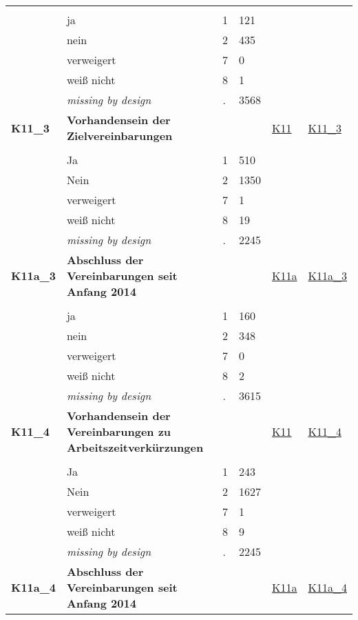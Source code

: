 \begin{longtable}{| L{2.45cm} | L{6cm} | C{1.5cm} | R{1cm} | C{2.25cm} | C{2.25cm} |}
   &  &  &  &  &  \\ 
   & ja & 1 & 121 &  &  \\ 
   & nein & 2 & 435 &  &  \\ 
   & verweigert & 7 & 0 &  &  \\ 
   & weiß nicht & 8 & 1 &  &  \\ 
   & \textit{missing by design} & \textit{.} & 3568 &  &  \\ 
   \midrule
\textbf{K11\_3}\label{var:K11:3} & \textbf{Vorhandensein der Zielvereinbarungen} &  &  & \hyperref[K11]{K11} & \hyperref[var:suf:K11:3]{K11\_3} \\ 
   &  &  &  &  &  \\ 
   & Ja & 1 & 510 &  &  \\ 
   & Nein & 2 & 1350 &  &  \\ 
   & verweigert & 7 & 1 &  &  \\ 
   & weiß nicht & 8 & 19 &  &  \\ 
   & \textit{missing by design} & \textit{.} & 2245 &  &  \\ 
   \midrule
\textbf{K11a\_3}\label{var:K11a:3} & \textbf{Abschluss der Vereinbarungen seit Anfang 2014} &  &  & \hyperref[K11a]{K11a} & \hyperref[var:suf:K11a:3]{K11a\_3} \\ 
   &  &  &  &  &  \\ 
   & ja & 1 & 160 &  &  \\ 
   & nein & 2 & 348 &  &  \\ 
   & verweigert & 7 & 0 &  &  \\ 
   & weiß nicht & 8 & 2 &  &  \\ 
   & \textit{missing by design} & \textit{.} & 3615 &  &  \\ 
   \midrule
\textbf{K11\_4}\label{var:K11:4} & \textbf{Vorhandensein der Vereinbarungen zu Arbeitszeitverkürzungen} &  &  & \hyperref[K11]{K11} & \hyperref[var:suf:K11:4]{K11\_4} \\ 
   &  &  &  &  &  \\ 
   & Ja & 1 & 243 &  &  \\ 
   & Nein & 2 & 1627 &  &  \\ 
   & verweigert & 7 & 1 &  &  \\ 
   & weiß nicht & 8 & 9 &  &  \\ 
   & \textit{missing by design} & \textit{.} & 2245 &  &  \\ 
   \midrule
\textbf{K11a\_4}\label{var:K11a:4} & \textbf{Abschluss der Vereinbarungen seit Anfang 2014} &  &  & \hyperref[K11a]{K11a} & \hyperref[var:suf:K11a:4]{K11a\_4} \\ 

\end{longtable}
